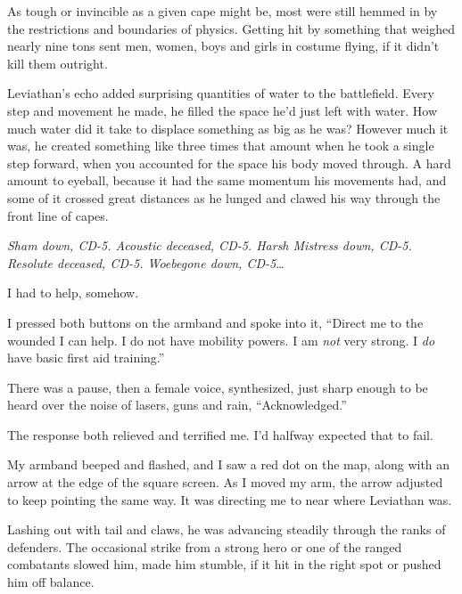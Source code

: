 





As tough or invincible as a given cape might be, most were still hemmed in by the restrictions and boundaries of physics.  Getting hit by something that weighed nearly nine tons sent men, women, boys and girls in costume flying, if it didn't kill them outright.



Leviathan's echo added surprising quantities of water to the battlefield.  Every step and movement he made, he filled the space he'd just left with water.  How much water did it take to displace something as big as he was?  However much it was, he created something like three times that amount when he took a single step forward, when you accounted for the space his body moved through.  A hard amount to eyeball, because it had the same momentum his movements had, and some of it crossed great distances as he lunged and clawed his way through the front line of capes.



\emph{Sham down, CD-5.  Acoustic deceased, CD-5.  Harsh Mistress down, CD-5.  Resolute deceased, CD-5.  Woebegone down, CD-5}\ldots



I had to help, somehow.



I pressed both buttons on the armband and spoke into it, ``Direct me to the wounded I can help.  I do not have mobility powers.  I am \emph{not} very strong.  I \emph{do} have basic first aid training.''



There was a pause, then a female voice, synthesized, just sharp enough to be heard over the noise of lasers, guns and rain, ``Acknowledged.''



The response both relieved and terrified me.  I'd halfway expected that to fail.



My armband beeped and flashed, and I saw a red dot on the map, along with an arrow at the edge of the square screen.  As I moved my arm, the arrow adjusted to keep pointing the same way.  It was directing me to near where Leviathan was.



Lashing out with tail and claws, he was advancing steadily through the ranks of defenders.  The occasional strike from a strong hero or one of the ranged combatants slowed him, made him stumble, if it hit in the right spot or pushed him off balance.



